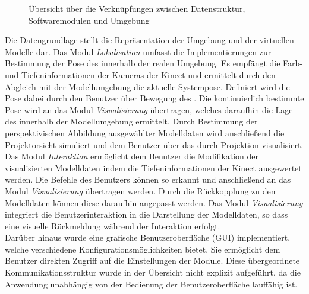 \begin{figure}[ht]
	\begin{center}%
		\caption{Übersicht über die Verknüpfungen zwischen Datenstruktur, Softwaremodulen und Umgebung}
		\label{fig.modules}
	\end{center}
\end{figure}

\prever{
}

Die Datengrundlage stellt die Repräsentation der Umgebung und der virtuellen Modelle dar. Das Modul \textit{Lokalisation} umfasst die Implementierungen zur Bestimmung der Pose des  innerhalb der realen Umgebung. Es empfängt die Farb- und Tiefeninformationen der Kameras der Kinect und ermittelt durch den Abgleich mit der Modellumgebung die aktuelle Systempose. Definiert wird die Pose dabei durch den Benutzer über Bewegung des . Die kontinuierlich bestimmte Pose wird an das Modul \textit{Visualisierung} übertragen, welches daraufhin die Lage des  innerhalb der Modellumgebung ermittelt. Durch Bestimmung der perspektivischen Abbildung ausgewählter Modelldaten wird anschließend die Projektorsicht simuliert und dem Benutzer über das \kps{} durch Projektion visualisiert.\\ 

Das Modul \textit{Interaktion} ermöglicht dem Benutzer die Modifikation der visualisierten Modelldaten indem die Tiefeninformationen der Kinect ausgewertet werden. Die Befehle des Benutzers können so erkannt und anschließend an das Modul \textit{Visualisierung} übertragen werden. Durch die Rückkopplung zu den Modelldaten können diese daraufhin angepasst werden. Das Modul \textit{Visualisierung} integriert die Benutzerinteraktion in die Darstellung der Modelldaten, so dass eine visuelle Rückmeldung während der Interaktion erfolgt.\\

Darüber hinaus wurde eine grafische Benutzeroberfläche (GUI) implementiert, welche verschiedene Konfigurationsmöglichkeiten bietet. Sie ermöglicht dem Benutzer direkten Zugriff auf die Einstellungen der Module. Diese übergeordnete Kommunikationsstruktur wurde in der Übersicht nicht explizit aufgeführt, da die Anwendung unabhängig von der Bedienung der Benutzeroberfläche lauffähig ist.\\

